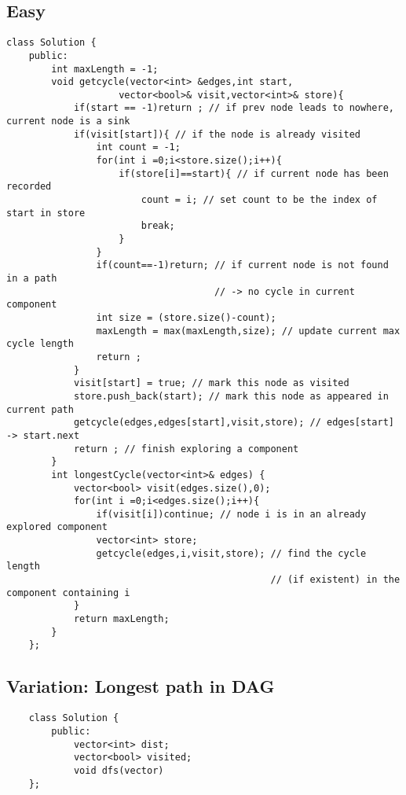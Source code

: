 \documentclass{article}
\begin{document}
\subsection*{Easy}
\begin{lstlisting}
class Solution {
    public:
        int maxLength = -1;
        void getcycle(vector<int> &edges,int start,
                    vector<bool>& visit,vector<int>& store){
            if(start == -1)return ; // if prev node leads to nowhere, current node is a sink
            if(visit[start]){ // if the node is already visited
                int count = -1; 
                for(int i =0;i<store.size();i++){
                    if(store[i]==start){ // if current node has been recorded
                        count = i; // set count to be the index of start in store
                        break;
                    }
                }
                if(count==-1)return; // if current node is not found in a path 
                                     // -> no cycle in current component
                int size = (store.size()-count); 
                maxLength = max(maxLength,size); // update current max cycle length
                return ;
            }
            visit[start] = true; // mark this node as visited
            store.push_back(start); // mark this node as appeared in current path
            getcycle(edges,edges[start],visit,store); // edges[start] -> start.next
            return ; // finish exploring a component
        }
        int longestCycle(vector<int>& edges) { 
            vector<bool> visit(edges.size(),0);
            for(int i =0;i<edges.size();i++){
                if(visit[i])continue; // node i is in an already explored component
                vector<int> store;
                getcycle(edges,i,visit,store); // find the cycle length 
                                               // (if existent) in the component containing i
            }
            return maxLength;
        }
    };
\end{lstlisting}

\subsection*{Variation: Longest path in DAG}
\begin{lstlisting}
    class Solution {
        public:
            vector<int> dist;
            vector<bool> visited;
            void dfs(vector)
    };
\end{lstlisting}
\end{document}
